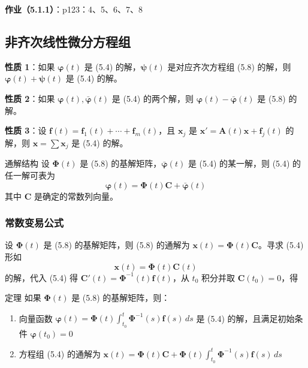 \textbf{作业（5.1.1）}：p123：4、5、6、7、8

\subsection{非齐次线性微分方程组}

\textbf{性质 1}：如果 $\boldsymbol{\varphi}(t)$ 是 (5.4) 的解，$\boldsymbol{\psi}(t)$ 是对应齐次方程组 (5.8) 的解，则 $\boldsymbol{\varphi}(t) + \boldsymbol{\psi}(t)$ 是 (5.4) 的解。

\textbf{性质 2}：如果 $\boldsymbol{\varphi}(t), \bar{\boldsymbol{\varphi}}(t)$ 是 (5.4) 的两个解，则 $\boldsymbol{\varphi}(t) - \bar{\boldsymbol{\varphi}}(t)$ 是 (5.8) 的解。

\textbf{性质 3}：设 $\mathbf{f}(t) = \mathbf{f}_1(t) + \cdots + \mathbf{f}_m(t)$，且 $\mathbf{x}_j$ 是 $\mathbf{x}' = \mathbf{A}(t)\mathbf{x} + \mathbf{f}_j(t)$ 的解，则 $\mathbf{x} = \sum \mathbf{x}_j$ 是 (5.4) 的解。

\begin{myTheorem}{通解结构}
设 $\boldsymbol{\Phi}(t)$ 是 (5.8) 的基解矩阵，$\bar{\boldsymbol{\varphi}}(t)$ 是 (5.4) 的某一解，则 (5.4) 的任一解可表为
$$\boldsymbol{\varphi}(t) = \boldsymbol{\Phi}(t)\mathbf{C} + \bar{\boldsymbol{\varphi}}(t)$$
其中 $\mathbf{C}$ 是确定的常数列向量。
\end{myTheorem}

\subsubsection{常数变易公式}

设 $\boldsymbol{\Phi}(t)$ 是 (5.8) 的基解矩阵，则 (5.8) 的通解为 $\mathbf{x}(t) = \boldsymbol{\Phi}(t)\mathbf{C}$。寻求 (5.4) 形如
\begin{equation}\mathbf{x}(t) = \boldsymbol{\Phi}(t)\mathbf{C}(t) \tag{5.17}\end{equation}
的解，代入 (5.4) 得 $\mathbf{C}'(t) = \boldsymbol{\Phi}^{-1}(t)\mathbf{f}(t)$，从 $t_0$ 积分并取 $\mathbf{C}(t_0) = 0$，得

\begin{myTheorem}{定理}
如果 $\boldsymbol{\Phi}(t)$ 是 (5.8) 的基解矩阵，则：
\begin{enumerate}
    \item 向量函数 $\boldsymbol{\varphi}(t) = \boldsymbol{\Phi}(t)\int_{t_0}^{t}\boldsymbol{\Phi}^{-1}(s)\mathbf{f}(s)\,ds$ 是 (5.4) 的解，且满足初始条件 $\boldsymbol{\varphi}(t_0) = 0$
    \item 方程组 (5.4) 的通解为 $\mathbf{x}(t) = \boldsymbol{\Phi}(t)\mathbf{C} + \boldsymbol{\Phi}(t)\int_{t_0}^{t}\boldsymbol{\Phi}^{-1}(s)\mathbf{f}(s)\,ds$
\end{enumerate}
\end{myTheorem}

